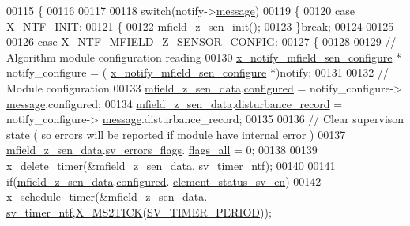 \begin{DoxyCode}
00115 \{
00116 
00117 
00118     \textcolor{keywordflow}{switch}(notify->\hyperlink{a00036_adf9665938515a20c283eea2c978cf80d}{message})
00119     \{
00120         \textcolor{keywordflow}{case} \hyperlink{a00036_a620b808f2d7b8d2a03c4d026a4c5423c}{X\_NTF\_INIT}:
00121         \{
00122             mfield\_z\_sen\_init();
00123         \}\textcolor{keywordflow}{break};
00124 
00125 
00126         \textcolor{keywordflow}{case} X\_NTF\_MFIELD\_Z\_SENSOR\_CONFIG:
00127         \{
00128 
00129               \textcolor{comment}{// Algorithm module configuration reading}
00130               \hyperlink{a00019_d2/d5e/a00860}{x\_notify\_mfield\_sen\_configure} * notify\_configure = (
      \hyperlink{a00019_d2/d5e/a00860}{x\_notify\_mfield\_sen\_configure} *)notify;
00131 
00132               \textcolor{comment}{// Module configuration}
00133               \hyperlink{a00053_ae42bea09c571df9fad890518725d5cf4}{mfield\_z\_sen\_data}.\hyperlink{a00027_a94b2d1f6ea4ab334c74d24984dd27843}{configured} = notify\_configure->
      \hyperlink{a00019_ae926905663cb8ca01f1bc2d670e428f5}{message}.configured;
00134               \hyperlink{a00053_ae42bea09c571df9fad890518725d5cf4}{mfield\_z\_sen\_data}.\hyperlink{a00027_ac9b38e2c1d3f1013a88d33506c754152}{disturbance\_record} = notify\_configure->
      \hyperlink{a00019_ae926905663cb8ca01f1bc2d670e428f5}{message}.disturbance\_record;
00135 
00136               \textcolor{comment}{// Clear supervison state ( so errors will be reported if module have internal error )}
00137               \hyperlink{a00053_ae42bea09c571df9fad890518725d5cf4}{mfield\_z\_sen\_data}.\hyperlink{a00027_aaeec6b0609dba31393f337abf1cce3d3}{sv\_errors\_flags}.
      \hyperlink{a00022_a1caa87b00c878186140c3bac9c8acf3b}{flags\_all} = 0;
00138 
00139               \hyperlink{a00036_ab69e9af4cfa717e870d587906283635c}{x\_delete\_timer}(&\hyperlink{a00053_ae42bea09c571df9fad890518725d5cf4}{mfield\_z\_sen\_data}.
      \hyperlink{a00027_ada91b200053f2d93e3639dc4ee3415b4}{sv\_timer\_ntf});
00140 
00141               \textcolor{keywordflow}{if}(\hyperlink{a00053_ae42bea09c571df9fad890518725d5cf4}{mfield\_z\_sen\_data}.\hyperlink{a00027_a94b2d1f6ea4ab334c74d24984dd27843}{configured}.
      \hyperlink{a00021_afeb3f74725269028a60926f98890c22b}{element\_status\_sv\_en})
00142               \hyperlink{a00036_a9e3befaa21e83f196f74201deed85346}{x\_schedule\_timer}(&\hyperlink{a00053_ae42bea09c571df9fad890518725d5cf4}{mfield\_z\_sen\_data}.
      \hyperlink{a00027_ada91b200053f2d93e3639dc4ee3415b4}{sv\_timer\_ntf},\hyperlink{a00036_a1732cd929c486b3a225824bb2b3dba36}{X\_MS2TICK}(\hyperlink{a00023_a8a535456285f4602701c814d7b69cc68}{SV\_TIMER\_PERIOD}));

\end{DoxyCode}
